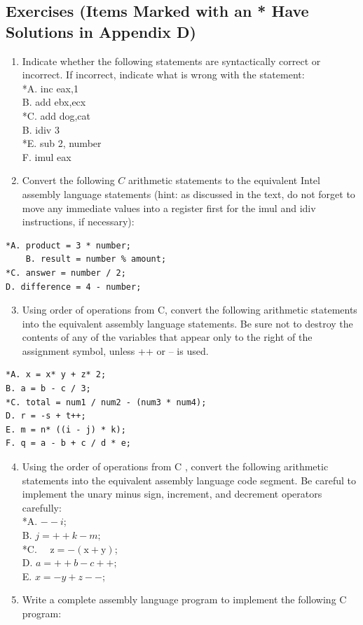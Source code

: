 \documentclass[10pt]{book}
\begin{document}
\subsection{Exercises (Items Marked with an * Have Solutions in Appendix D)}
\begin{enumerate}
  \item Indicate whether the following statements are syntactically correct or incorrect. If incorrect, indicate what is wrong with the statement:\\
*A. inc eax,1\\
B. add ebx,ecx\\
*C. add dog,cat\\
B. idiv 3\\
*E. sub 2, number\\
F. imul eax
  \item Convert the following $C$ arithmetic statements to the equivalent Intel assembly language statements (hint: as discussed in the text, do not forget to move any immediate values into a register first for the imul and idiv instructions, if necessary):
\end{enumerate}

\begin{verbatim}
*A. product = 3 * number;
    B. result = number % amount;
*C. answer = number / 2;
D. difference = 4 - number;
\end{verbatim}

\begin{enumerate}
  \setcounter{enumi}{2}
  \item Using order of operations from C, convert the following arithmetic statements into the equivalent assembly language statements. Be sure not to destroy the contents of any of the variables that appear only to the right of the assignment symbol, unless ++ or -- is used.
\end{enumerate}

\begin{verbatim}
*A. x = x* y + z* 2;
B. a = b - c / 3;
*C. total = num1 / num2 - (num3 * num4);
D. r = -s + t++;
E. m = n* ((i - j) * k);
F. q = a - b + c / d * e;
\end{verbatim}

\begin{enumerate}
  \setcounter{enumi}{3}
  \item Using the order of operations from C , convert the following arithmetic statements into the equivalent assembly language code segment. Be careful to implement the unary minus sign, increment, and decrement operators carefully:\\
*A. $--i$;\\
B. $j=++k-m;$\\
*C. $\quad \mathrm{z}=-(\mathrm{x}+\mathrm{y})$;\\
D. $a=++b-c++;$\\
E. $x=-y+z--$;
\item Write a complete assembly language program to implement the following C program:
\end{enumerate}
\end{document}
